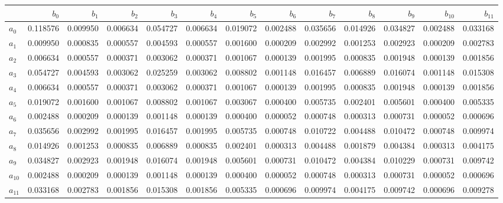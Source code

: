 \begin{tabular}{lrrrrrrrrrrrr}
\toprule
 & $b_{0}$ & $b_{1}$ & $b_{2}$ & $b_{3}$ & $b_{4}$ & $b_{5}$ & $b_{6}$ & $b_{7}$ & $b_{8}$ & $b_{9}$ & $b_{10}$ & $b_{11}$ \\
\midrule
$a_{0}$ & 0.118576 & 0.009950 & 0.006634 & 0.054727 & 0.006634 & 0.019072 & 0.002488 & 0.035656 & 0.014926 & 0.034827 & 0.002488 & 0.033168 \\
$a_{1}$ & 0.009950 & 0.000835 & 0.000557 & 0.004593 & 0.000557 & 0.001600 & 0.000209 & 0.002992 & 0.001253 & 0.002923 & 0.000209 & 0.002783 \\
$a_{2}$ & 0.006634 & 0.000557 & 0.000371 & 0.003062 & 0.000371 & 0.001067 & 0.000139 & 0.001995 & 0.000835 & 0.001948 & 0.000139 & 0.001856 \\
$a_{3}$ & 0.054727 & 0.004593 & 0.003062 & 0.025259 & 0.003062 & 0.008802 & 0.001148 & 0.016457 & 0.006889 & 0.016074 & 0.001148 & 0.015308 \\
$a_{4}$ & 0.006634 & 0.000557 & 0.000371 & 0.003062 & 0.000371 & 0.001067 & 0.000139 & 0.001995 & 0.000835 & 0.001948 & 0.000139 & 0.001856 \\
$a_{5}$ & 0.019072 & 0.001600 & 0.001067 & 0.008802 & 0.001067 & 0.003067 & 0.000400 & 0.005735 & 0.002401 & 0.005601 & 0.000400 & 0.005335 \\
$a_{6}$ & 0.002488 & 0.000209 & 0.000139 & 0.001148 & 0.000139 & 0.000400 & 0.000052 & 0.000748 & 0.000313 & 0.000731 & 0.000052 & 0.000696 \\
$a_{7}$ & 0.035656 & 0.002992 & 0.001995 & 0.016457 & 0.001995 & 0.005735 & 0.000748 & 0.010722 & 0.004488 & 0.010472 & 0.000748 & 0.009974 \\
$a_{8}$ & 0.014926 & 0.001253 & 0.000835 & 0.006889 & 0.000835 & 0.002401 & 0.000313 & 0.004488 & 0.001879 & 0.004384 & 0.000313 & 0.004175 \\
$a_{9}$ & 0.034827 & 0.002923 & 0.001948 & 0.016074 & 0.001948 & 0.005601 & 0.000731 & 0.010472 & 0.004384 & 0.010229 & 0.000731 & 0.009742 \\
$a_{10}$ & 0.002488 & 0.000209 & 0.000139 & 0.001148 & 0.000139 & 0.000400 & 0.000052 & 0.000748 & 0.000313 & 0.000731 & 0.000052 & 0.000696 \\
$a_{11}$ & 0.033168 & 0.002783 & 0.001856 & 0.015308 & 0.001856 & 0.005335 & 0.000696 & 0.009974 & 0.004175 & 0.009742 & 0.000696 & 0.009278 \\
\bottomrule
\end{tabular}
